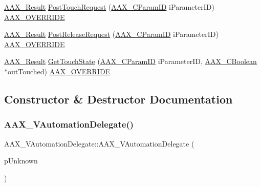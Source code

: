 \begin{DoxyCompactItemize}
\item 
\mbox{\hyperlink{a00392_a4d8f69a697df7f70c3a8e9b8ee130d2f}{A\+A\+X\+\_\+\+Result}} \mbox{\hyperlink{a01893_a2941ee0db1ec78047f389090c75d3835}{Post\+Touch\+Request}} (\mbox{\hyperlink{a00392_a1440c756fe5cb158b78193b2fc1780d1}{A\+A\+X\+\_\+\+C\+Param\+ID}} i\+Parameter\+ID) \mbox{\hyperlink{a00392_ac2f24a5172689ae684344abdcce55463}{A\+A\+X\+\_\+\+O\+V\+E\+R\+R\+I\+DE}}
\item 
\mbox{\hyperlink{a00392_a4d8f69a697df7f70c3a8e9b8ee130d2f}{A\+A\+X\+\_\+\+Result}} \mbox{\hyperlink{a01893_a2808e1e38836349f6e51d72e0219cfe4}{Post\+Release\+Request}} (\mbox{\hyperlink{a00392_a1440c756fe5cb158b78193b2fc1780d1}{A\+A\+X\+\_\+\+C\+Param\+ID}} i\+Parameter\+ID) \mbox{\hyperlink{a00392_ac2f24a5172689ae684344abdcce55463}{A\+A\+X\+\_\+\+O\+V\+E\+R\+R\+I\+DE}}
\item 
\mbox{\hyperlink{a00392_a4d8f69a697df7f70c3a8e9b8ee130d2f}{A\+A\+X\+\_\+\+Result}} \mbox{\hyperlink{a01893_a4268eba9f5d1e7c0e163d0c4071dcaf3}{Get\+Touch\+State}} (\mbox{\hyperlink{a00392_a1440c756fe5cb158b78193b2fc1780d1}{A\+A\+X\+\_\+\+C\+Param\+ID}} i\+Parameter\+ID, \mbox{\hyperlink{a00392_aa216506530f1d19a2965931ced2b274b}{A\+A\+X\+\_\+\+C\+Boolean}} $\ast$out\+Touched) \mbox{\hyperlink{a00392_ac2f24a5172689ae684344abdcce55463}{A\+A\+X\+\_\+\+O\+V\+E\+R\+R\+I\+DE}}
\end{DoxyCompactItemize}


\subsection{Constructor \& Destructor Documentation}
\mbox{\label{a01893_a4390446f2d57916419490f46b6978826}} 
\subsubsection{\texorpdfstring{AAX\_VAutomationDelegate()}{AAX\_VAutomationDelegate()}}
{\footnotesize\ttfamily A\+A\+X\+\_\+\+V\+Automation\+Delegate\+::\+A\+A\+X\+\_\+\+V\+Automation\+Delegate (\begin{DoxyParamCaption}\item[{\mbox{\hyperlink{a01409}{I\+A\+C\+F\+Unknown}} $\ast$}]{p\+Unknown }\end{DoxyParamCaption})}

